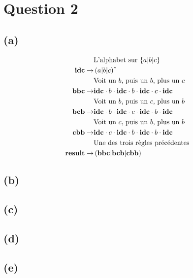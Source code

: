 \documentclass[class=article]{standalone}
\begin{document}
\section*{Question 2}
\subsection*{(a)}
\begin{align*}
&\text{L'alphabet sur $\left \{ a|b|c \right \}$}\\
{\bf{idc}} \rightarrow& \left ( a|b|c \right )^*\\
&\text{Voit un $b$, puis un $b$, plus un $c$}\\
{\bf{bbc}} \rightarrow& {\bf{idc}}\cdot b \cdot{\bf{idc}}\cdot b\cdot{\bf{idc}}\cdot c\cdot{\bf{idc}}\\
&\text{Voit un $b$, puis un $c$, plus un $b$}\\
{\bf{bcb}} \rightarrow& {\bf{idc}}\cdot b\cdot{\bf{idc}}\cdot c\cdot{\bf{idc}}\cdot b\cdot{\bf{idc}}\\
&\text{Voit un $c$, puis un $b$, plus un $b$}\\
{\bf{cbb}} \rightarrow& {\bf{idc}}\cdot c\cdot{\bf{idc}}\cdot b\cdot{\bf{idc}}\cdot b\cdot{\bf{idc}}\\
&\text{Une des trois règles précédentes}\\
{\bf{result}} \rightarrow& \left ( {\bf{bbc}} | {\bf{bcb}} | {\bf{cbb}} \right )
\end{align*}
\subsection*{(b)}
\subsection*{(c)}
\subsection*{(d)}
\subsection*{(e)}
\end{document}
